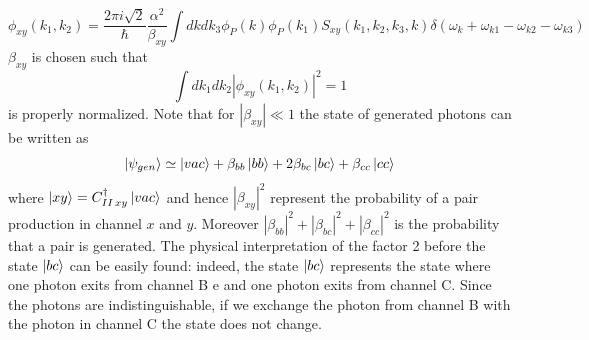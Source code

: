 \begin{equation}\label{biphoton}\phi_{xy}(k_1,k_2) = \frac{2\pi i \sqrt{2}}{\hbar} \frac{\alpha^2}{\beta_{xy}}\int dk dk_3\phi_P(k)\phi_P(k_1)S_{xy}(k_1,k_2,k_3,k)\delta(\omega_{k}+\omega_{k1}-\omega_{k2}-\omega_{k3}) \end{equation}
$\beta_{xy}$ is chosen such that
\begin{equation}\int dk_1 dk_2 |\phi_{xy}(k_1,k_2)|^2 = 1\end{equation}
is properly normalized. Note that for $|\beta_{xy}| \ll 1 $ the state of generated photons can be written as
\begin{equation}\ket{\psi_{gen}} \simeq \ket{vac} + \beta_{bb}\ket{bb}+2\beta_{bc}\ket{bc}+ \beta_{cc}\ket{cc} \end{equation}
where $\ket{xy} = C_{II\, xy}^\dagger\ket{vac}$ and hence $|\beta_{xy}|^2$ represent the probability of a pair production in channel $x$ and $y$. Moreover
$|\beta_{bb}|^2 + |\beta_{bc}|^2 +|\beta_{cc}|^2$ is the probability that a pair is generated. The physical interpretation of the factor 2 before the state $\ket{bc}$ can be easily found: indeed, the state $\ket{bc}$ represents the state where one photon exits from channel B e and one photon exits from channel C. Since the photons are indistinguishable, if we exchange the photon from channel B with the photon in channel C the state does not change.


